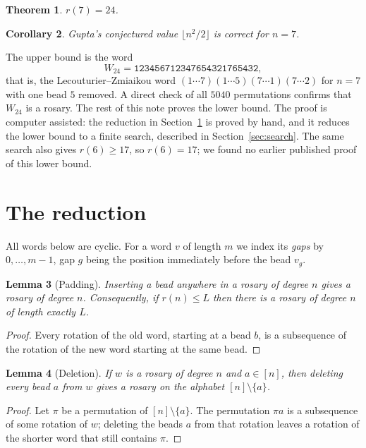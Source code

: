 \documentclass[a4paper,11pt]{amsart}
\newtheorem{theorem}{Theorem}
\newtheorem{lemma}[theorem]{Lemma}
\newtheorem{corollary}[theorem]{Corollary}
\theoremstyle{remark}
\newcommand{\word}{\texttt{123456712347654321765432}}
\begin{document}
\begin{theorem}\label{thm:main}
$r(7)=24$.
\end{theorem}

\begin{corollary}
Gupta's conjectured value $\lfloor n^2/2\rfloor$ is correct for $n=7$.
\end{corollary}

The upper bound is the word
\[
  W_{24}=\word ,
\]
that is, the Lecouturier--Zmiaikou word $(1\cdots7)(1\cdots5)(7\cdots1)(7\cdots2)$
for $n=7$ \cite[Theorem~2]{LZ2012} with one bead $5$ removed.  A direct check
of all $5040$ permutations confirms that $W_{24}$ is a rosary.  The rest of
this note proves the lower bound.  The proof is computer assisted: the
reduction in Section~\ref{sec:reduction} is proved by hand, and it reduces
the lower bound to a finite search, described in Section~\ref{sec:search}.
The same search also gives $r(6)\ge 17$, so $r(6)=17$; we found no earlier
published proof of this lower bound.

\section{The reduction}\label{sec:reduction}

All words below are cyclic.  For a word $v$ of length $m$ we index its
\emph{gaps} by $0,\dots,m-1$, gap $g$ being the position immediately before
the bead $v_g$.

\begin{lemma}[Padding]\label{lem:pad}
Inserting a bead anywhere in a rosary of degree $n$ gives a rosary of degree
$n$.  Consequently, if $r(n)\le L$ then there is a rosary of degree $n$ of
length exactly $L$.
\end{lemma}

\begin{proof}
Every rotation of the old word, starting at a bead $b$, is a subsequence of
the rotation of the new word starting at the same bead.
\end{proof}

\begin{lemma}[Deletion]\label{lem:del}
If $w$ is a rosary of degree $n$ and $a\in[n]$, then deleting every bead $a$
from $w$ gives a rosary on the alphabet $[n]\setminus\{a\}$.
\end{lemma}

\begin{proof}
Let $\pi$ be a permutation of $[n]\setminus\{a\}$.  The permutation
$\pi a$ is a subsequence of some rotation of $w$; deleting the beads $a$
from that rotation leaves a rotation of the shorter word that still contains
$\pi$.
\end{proof}
\end{document}
